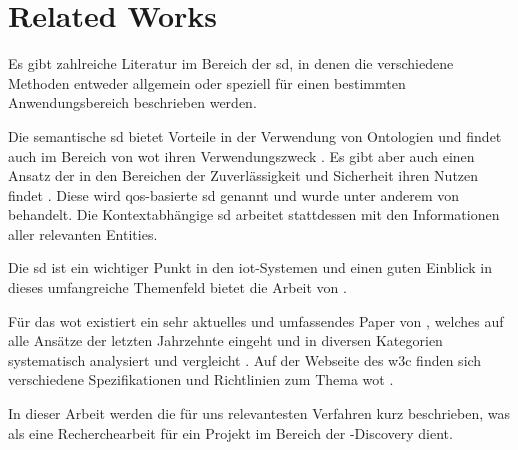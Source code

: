 \section{Related Works}\label{sec:relatedworks}

Es gibt zahlreiche Literatur im Bereich der \gls{sd}, in denen die verschiedene Methoden entweder allgemein oder speziell für einen bestimmten Anwendungsbereich beschrieben werden.

Die semantische \gls{sd} bietet Vorteile in der Verwendung von Ontologien \autocite{Novo.2020.SIitI} und findet auch im Bereich von \gls{wot} ihren Verwendungszweck \autocite{Serena.2018.SDitWoT}.
Es gibt aber auch einen Ansatz der in den Bereichen der Zuverlässigkeit und Sicherheit ihren Nutzen findet \autocite{Li..ADTCaQASDFftIoT}. Diese wird \gls{qos}-basierte \gls{sd} \autocite{Kosunalp.2020.SArlbQaIsdm} genannt und wurde unter anderem von \citeauthor{Kosunalp.2020.SArlbQaIsdm} behandelt.
Die Kontextabhängige \gls{sd} \autocite{Sukode.2015.CAFIIAS} arbeitet stattdessen mit den Informationen aller relevanten Entities.

Die \gls{sd} ist ein wichtiger Punkt in den \gls{iot}-Systemen und einen guten Einblick in dieses umfangreiche Themenfeld bietet die Arbeit \autocite{Achir.2022.SdasiIAsaat} von \citeauthor{Achir.2022.SdasiIAsaat}.

Für das \gls{wot} existiert ein sehr aktuelles und umfassendes Paper von \citeauthor{Sciullo.2022.ASotWoT}, welches auf alle Ansätze der letzten Jahrzehnte eingeht und in diversen Kategorien systematisch analysiert und vergleicht \autocite{Sciullo.2022.ASotWoT}. Auf der Webseite des \gls{w3c} finden sich verschiedene Spezifikationen und Richtlinien zum Thema \gls{wot} \autocites{w3c.wot.architecture.20200408}{w3c.wot.td.20200623}{w3c.wot.discovery.20210602}{w3c.wot.spg.20191106}.

In dieser Arbeit werden die für uns relevantesten Verfahren kurz beschrieben, was als eine Recherchearbeit für ein Projekt im Bereich der -Discovery dient.
